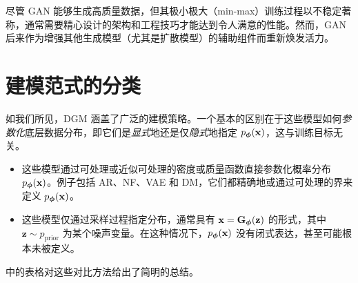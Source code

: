 
尽管 GAN 能够生成高质量数据，但其极小极大（min-max）训练过程以不稳定著称，通常需要精心设计的架构和工程技巧才能达到令人满意的性能。然而，GAN 后来作为增强其他生成模型（尤其是扩散模型）的辅助组件而重新焕发活力。





\newpage
\section{建模范式的分类}\label{sec:taxonomy}


如我们所见，DGM 涵盖了广泛的建模策略。一个基本的区别在于这些模型如何\emph{参数化}底层数据分布，即它们是\emph{显式}地还是仅\emph{隐式}地指定 $p_{\bm{\phi}}(\mathbf{x})$，这与训练目标无关。

\begin{itemize}
  \item {}
  这些模型通过可处理或近似可处理的密度或质量函数直接参数化概率分布 $p_{\bm{\phi}}(\mathbf{x})$。例子包括 AR、NF、VAE 和 DM，它们都精确地或通过可处理的界来定义 $p_{\bm{\phi}}(\mathbf{x})$。

  \item {}
  这些模型仅通过采样过程指定分布，通常具有 $\mathbf{x} = {\mathbf{G}}_{\bm{\phi}}(\mathbf{z})$ 的形式，其中 $\mathbf{z} \sim p_{\mathrm{prior}}$ 为某个噪声变量。在这种情况下，$p_{\bm{\phi}}(\mathbf{x})$ 没有闭式表达，甚至可能根本未被定义。
\end{itemize}


 中的表格对这些对比方法给出了简明的总结。



